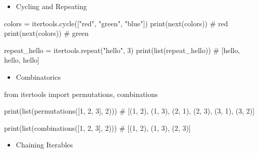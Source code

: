 \documentclass[
  letterpaper,
  DIV=11,
  numbers=noendperiod]{scrreprt}
\newenvironment{Shaded}{\begin{snugshade}}{\end{snugshade}}
\newcommand{\BuiltInTok}[1]{\textcolor[rgb]{0.00,0.23,0.31}{#1}}
\newcommand{\CommentTok}[1]{\textcolor[rgb]{0.37,0.37,0.37}{#1}}
\newcommand{\DecValTok}[1]{\textcolor[rgb]{0.68,0.00,0.00}{#1}}
\newcommand{\ImportTok}[1]{\textcolor[rgb]{0.00,0.46,0.62}{#1}}
\newcommand{\NormalTok}[1]{\textcolor[rgb]{0.00,0.23,0.31}{#1}}
\newcommand{\OperatorTok}[1]{\textcolor[rgb]{0.37,0.37,0.37}{#1}}
\newcommand{\StringTok}[1]{\textcolor[rgb]{0.13,0.47,0.30}{#1}}
\providecommand{\tightlist}{%
  \setlength{\itemsep}{0pt}\setlength{\parskip}{0pt}}
\begin{document}
\begin{itemize}
\tightlist
\item
  Cycling and Repeating
\end{itemize}

\begin{Shaded}
\begin{Highlighting}[]
\NormalTok{colors }\OperatorTok{=}\NormalTok{ itertools.cycle([}\StringTok{"red"}\NormalTok{, }\StringTok{"green"}\NormalTok{, }\StringTok{"blue"}\NormalTok{])}
\BuiltInTok{print}\NormalTok{(}\BuiltInTok{next}\NormalTok{(colors))  }\CommentTok{\# red}
\BuiltInTok{print}\NormalTok{(}\BuiltInTok{next}\NormalTok{(colors))  }\CommentTok{\# green}

\NormalTok{repeat\_hello }\OperatorTok{=}\NormalTok{ itertools.repeat(}\StringTok{"hello"}\NormalTok{, }\DecValTok{3}\NormalTok{)}
\BuiltInTok{print}\NormalTok{(}\BuiltInTok{list}\NormalTok{(repeat\_hello))  }\CommentTok{\# [\textquotesingle{}hello\textquotesingle{}, \textquotesingle{}hello\textquotesingle{}, \textquotesingle{}hello\textquotesingle{}]}
\end{Highlighting}
\end{Shaded}

\begin{itemize}
\tightlist
\item
  Combinatorics
\end{itemize}

\begin{Shaded}
\begin{Highlighting}[]
\ImportTok{from}\NormalTok{ itertools }\ImportTok{import}\NormalTok{ permutations, combinations}

\BuiltInTok{print}\NormalTok{(}\BuiltInTok{list}\NormalTok{(permutations([}\DecValTok{1}\NormalTok{, }\DecValTok{2}\NormalTok{, }\DecValTok{3}\NormalTok{], }\DecValTok{2}\NormalTok{)))}
\CommentTok{\# [(1, 2), (1, 3), (2, 1), (2, 3), (3, 1), (3, 2)]}

\BuiltInTok{print}\NormalTok{(}\BuiltInTok{list}\NormalTok{(combinations([}\DecValTok{1}\NormalTok{, }\DecValTok{2}\NormalTok{, }\DecValTok{3}\NormalTok{], }\DecValTok{2}\NormalTok{)))}
\CommentTok{\# [(1, 2), (1, 3), (2, 3)]}
\end{Highlighting}
\end{Shaded}

\begin{itemize}
\tightlist
\item
  Chaining Iterables
\end{itemize}
\end{document}
